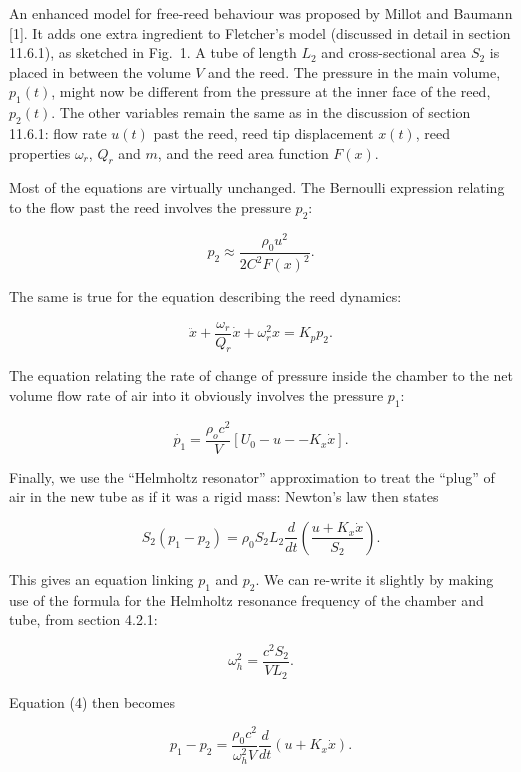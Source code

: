   An enhanced model for free-reed behaviour was proposed by Millot and Baumann 
  [1]. It adds one extra ingredient to Fletcher's model (discussed in detail in 
  section 11.6.1), as sketched in Fig.\ 1. A tube of length $L_2$ and 
  cross-sectional area $S_2$ is placed in between the volume $V$ and the reed. 
  The pressure in the main volume, $p_1(t)$, might now be different from the 
  pressure at the inner face of the reed, $p_2(t)$. The other variables remain 
  the same as in the discussion of section 11.6.1: flow rate $u(t)$ past the 
  reed, reed tip displacement $x(t)$, reed properties $\omega_r$, $Q_r$ and 
  $m$, and the reed area function $F(x)$. 


  Most of the equations are virtually unchanged. The Bernoulli expression 
  relating to the flow past the reed involves the pressure $p_2$: 

  $$p_2 \approx \dfrac{\rho_0 u^2}{2 C^2 F(x)^2} . \tag{1}$$ 

  The same is true for the equation describing the reed dynamics: 

  $$\ddot{x}+\dfrac{\omega_r}{Q_r}\dot{x}+\omega_r^2 x = K_p p_2 . \tag{2}$$ 

  The equation relating the rate of change of pressure inside the chamber to 
  the net volume flow rate of air into it obviously involves the pressure 
  $p_1$: 

  $$\dot{p_1}=\dfrac{\rho_o c^2}{V}[U_0 -u -- K_x \dot{x}] . \tag{3}$$ 

  Finally, we use the ``Helmholtz resonator'' approximation to treat the 
  ``plug'' of air in the new tube as if it was a rigid mass: Newton's law then 
  states 

  $$S_2(p_1-p_2)=\rho_0 S_2 L_2\dfrac{d}{dt}\left(\dfrac{u+K_x \dot{x}}{S_2} 
  \right) . \tag{4}$$ 

  This gives an equation linking $p_1$ and $p_2$. We can re-write it slightly 
  by making use of the formula for the Helmholtz resonance frequency of the 
  chamber and tube, from section 4.2.1: 

  $$\omega_h^2=\dfrac{c^2 S_2}{VL_2} . \tag{5}$$ 

  Equation (4) then becomes 

  $$p_1-p_2=\dfrac{\rho_0 c^2}{\omega_h^2 V} \dfrac{d}{dt}\left(u+K_x \dot{x} 
  \right) . \tag{6}$$ 

